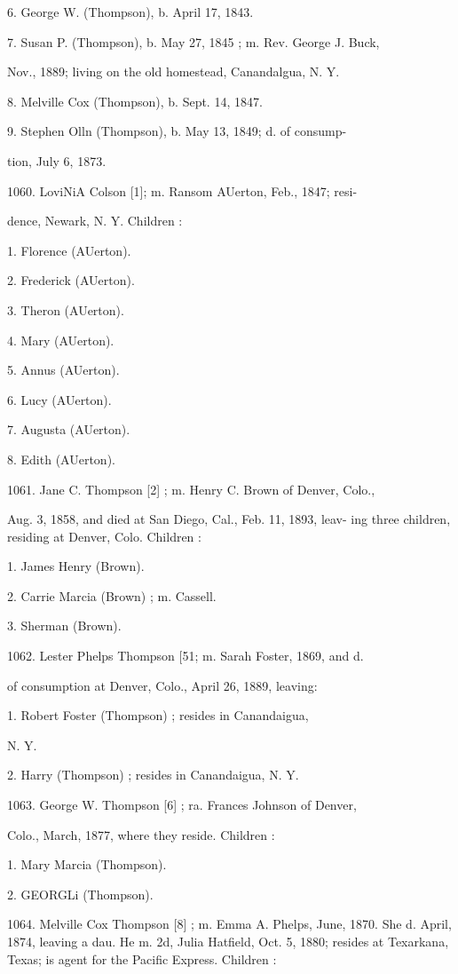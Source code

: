 \documentclass{book}
\begin{document}
6. George W. (Thompson), b. April 17, 1843. 

7. Susan P. (Thompson), b. May 27, 1845 ; m. Rev. George J. Buck, 

Nov., 1889; living on the old homestead, Canandalgua, N. Y. 

8. Melville Cox (Thompson), b. Sept. 14, 1847. 

9. Stephen Olln (Thompson), b. May 13, 1849; d. of consump- 

tion, July 6, 1873. 

1060. LoviNiA Colson [1]; m. Ransom AUerton, Feb., 1847; resi- 

dence, Newark, N. Y. Children : 

1. Florence (AUerton). 

2. Frederick (AUerton). 

3. Theron (AUerton). 

4. Mary (AUerton). 

5. Annus (AUerton). 

6. Lucy (AUerton). 

7. Augusta (AUerton). 

8. Edith (AUerton). 

1061. Jane C. Thompson [2] ; m. Henry C. Brown of Denver, Colo., 

Aug. 3, 1858, and died at San Diego, Cal., Feb. 11, 1893, leav- 
ing three children, residing at Denver, Colo. Children : 

1. James Henry (Brown). 

2. Carrie Marcia (Brown) ; m. Cassell. 

3. Sherman (Brown). 

1062. Lester Phelps Thompson [51; m. Sarah Foster, 1869, and d. 

of consumption at Denver, Colo., April 26, 1889, leaving: 

1. Robert Foster (Thompson) ; resides in Canandaigua, 

N. Y. 

2. Harry (Thompson) ; resides in Canandaigua, N. Y. 

1063. George W. Thompson [6] ; ra. Frances Johnson of Denver, 

Colo., March, 1877, where they reside. Children : 

1. Mary Marcia (Thompson). 

2. GEORGLi (Thompson). 




1064. Melville Cox Thompson [8] ; m. Emma A. Phelps, June, 
1870. She d. April, 1874, leaving a dau. He m. 2d, Julia 
Hatfield, Oct. 5, 1880; resides at Texarkana, Texas; is agent 
for the Pacific Express. Children : 
\end{document}
